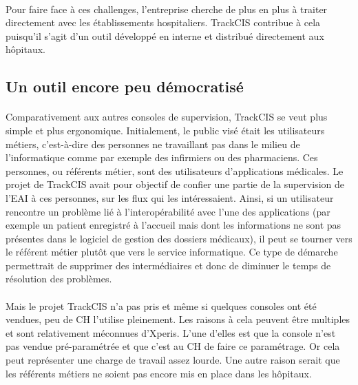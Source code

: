 			\paragraph{}%
			Pour faire face à ces challenges, l'entreprise cherche de plus 
			en plus à traiter directement avec les établissements hospitaliers. TrackCIS
			contribue à cela puisqu'il s'agit d'un outil développé en interne et
			distribué directement aux hôpitaux.
			
		\subsection{Un outil encore peu démocratisé}
			\paragraph{}%
			Comparativement aux autres consoles de supervision, TrackCIS se veut plus
			simple et plus ergonomique. Initialement, le public visé était les
			utilisateurs métiers, c'est-à-dire des personnes ne travaillant pas dans le
			milieu de l'informatique comme par exemple des infirmiers ou des pharmaciens.
			Ces personnes, ou référents métier, sont des utilisateurs d'applications
			médicales. Le projet de TrackCIS avait pour objectif de confier une partie de
			la supervision de l'EAI à ces personnes, sur les flux qui les intéressaient.
			Ainsi, si un utilisateur rencontre un problème lié à l'interopérabilité avec
			l'une des applications (par exemple un patient enregistré à l'accueil mais
			dont les informations ne sont pas présentes dans le logiciel de gestion des
			dossiers médicaux), il peut se tourner vers le référent métier plutôt que
			vers le service informatique. Ce type de démarche permettrait de supprimer
			des intermédiaires et donc de diminuer le temps de résolution des problèmes.
			
			\paragraph{}%
			Mais le projet TrackCIS n'a pas pris et même si quelques consoles ont été
			vendues, peu de CH l'utilise pleinement. Les raisons à cela peuvent être
			multiples et sont relativement méconnues d'Xperis. L'une d'elles est que la
			console n'est pas vendue pré-paramétrée et que c'est au CH de faire ce
			paramétrage.
			Or cela peut représenter une charge de travail assez lourde. Une autre
			raison serait que les référents métiers ne soient pas encore mis en place
			dans les hôpitaux.
			
